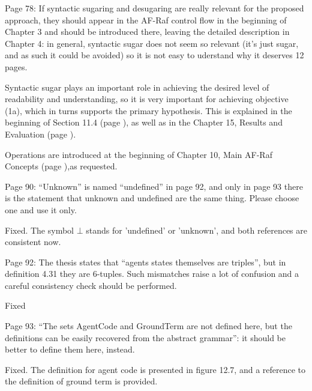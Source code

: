 \documentclass{article}
\newenvironment{them}{\noindent\begingroup\color{blue}}{\endgroup\par}
\begin{document}
\begin{them}

Page 78:
If syntactic sugaring and desugaring are really relevant for the proposed
approach, they should appear in the AF-Raf control flow in the beginning of
Chapter 3 and should be introduced there, leaving the detailed description in
Chapter 4: in general, syntactic sugar does not seem so relevant (it's just
sugar, and as such it could be avoided) so it is not easy to uderstand why it
deserves 12 pages.

\end{them}

Syntactic sugar plays an important role in achieving the desired level of
readability and understanding, so it is very important for achieving objective
(1a), which in turns supports the primary hypothesis. This is explained in the
beginning of Section 11.4 (page ), as well as in the Chapter 15, Results and
Evaluation (page ).

Operations are introduced at the beginning of Chapter 10, Main AF-Raf Concepts
(page ),as requested.

\begin{them}

Page 90:
“Unknown” is named “undefined” in page 92, and only in page 93 there is the
statement that unknown and undefined are the same thing. Please choose one and
use it only.

\end{them}
Fixed. The symbol $\bot$ stands for 'undefined' or 'unknown', and both
references are consistent now. 

\begin{them}

Page 92:
The thesis states that “agents states themselves are triples”, but in
definition 4.31 they are 6-tuples.  Such mismatches raise a lot of confusion
and a careful consistency check should be performed.

\end{them}
Fixed

\begin{them}

Page 93:
“The sets AgentCode and GroundTerm are not defined here, but the definitions
can be easily recovered from the abstract grammar”: it should be better to
define them here, instead.

\end{them}
Fixed. The definition for agent code is presented in figure 12.7, and a
reference to the definition of ground term is provided.
\end{document}

